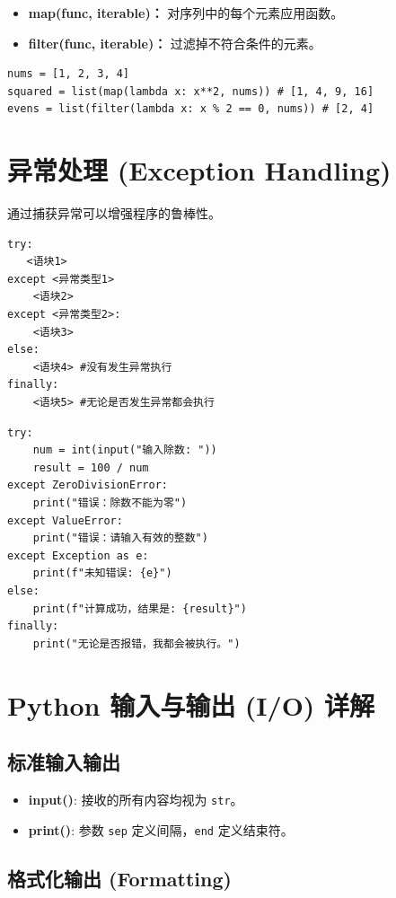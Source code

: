 \documentclass{article}
\begin{document}
\begin{itemize}
    \item \textbf{map(func, iterable)：} 对序列中的每个元素应用函数。
    \item \textbf{filter(func, iterable)：} 过滤掉不符合条件的元素。
\end{itemize}

\begin{lstlisting}
nums = [1, 2, 3, 4]
squared = list(map(lambda x: x**2, nums)) # [1, 4, 9, 16]
evens = list(filter(lambda x: x % 2 == 0, nums)) # [2, 4]
\end{lstlisting}

\section{异常处理 (Exception Handling)}
通过捕获异常可以增强程序的鲁棒性。

\begin{lstlisting}
try:
   <语块1>
except <异常类型1>
    <语块2>
except <异常类型2>:
    <语块3>
else:
    <语块4> #没有发生异常执行
finally:
    <语块5> #无论是否发生异常都会执行

\end{lstlisting}
\begin{lstlisting}
try:
    num = int(input("输入除数: "))
    result = 100 / num
except ZeroDivisionError:
    print("错误：除数不能为零")
except ValueError:
    print("错误：请输入有效的整数")
except Exception as e:
    print(f"未知错误: {e}")
else:
    print(f"计算成功，结果是: {result}")
finally:
    print("无论是否报错，我都会被执行。")
\end{lstlisting}

\section{Python 输入与输出 (I/O) 详解}

\subsection{标准输入输出}
\begin{itemize}
    \item \textbf{input()}: 接收的所有内容均视为 \texttt{str}。
    \item \textbf{print()}: 参数 \texttt{sep} 定义间隔，\texttt{end} 定义结束符。
\end{itemize}

\subsection{格式化输出 (Formatting)}
\end{document}
